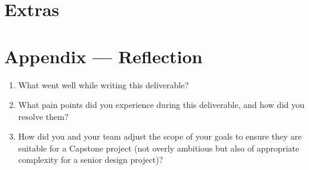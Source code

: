 \documentclass{article}
\begin{document}
    \section{Extras}


    \newpage{}
    \section*{Appendix --- Reflection}

    

    \begin{enumerate}
        \item What went well while writing this deliverable?
        \item What pain points did you experience during this deliverable, and how
        did you resolve them?
        \item How did you and your team adjust the scope of your goals to ensure
        they are suitable for a Capstone project (not overly ambitious but also of
        appropriate complexity for a senior design project)?
    \end{enumerate}
\end{document}
